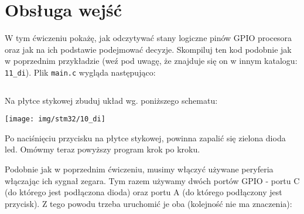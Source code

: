 % 
% 
% 
% 


\section{Obsługa wejść}
W tym ćwiczeniu pokażę, jak odczytywać stany logiczne pinów GPIO procesora oraz jak na ich podstawie podejmować
decyzje. Skompiluj ten kod podobnie jak w poprzednim przykładzie (weź pod uwagę, że znajduje się on w innym katalogu: \Verb$11_di$).
Plik \Verb$main.c$ wygląda następująco:

\inputminted[frame=single,firstline=11]{c}{stm32-examples/11_di/main.c}

Na płytce stykowej zbuduj układ wg. poniższego schematu:

\begin{center}\texttt{[image: img/stm32/10\_di]}\end{center}

Po naciśnięciu przycisku na płytce stykowej, powinna zapalić się zielona dioda led. Omówmy teraz powyższy program krok po kroku.

Podobnie jak w poprzednim ćwiczeniu, musimy włączyć używane peryferia włączając ich sygnał zegara. Tym razem używamy
dwóch portów GPIO - portu C (do którego jest podłączona dioda) oraz portu A (do którego podłączony jest przycisk).
Z tego powodu trzeba uruchomić je oba (kolejność nie ma znaczenia):

